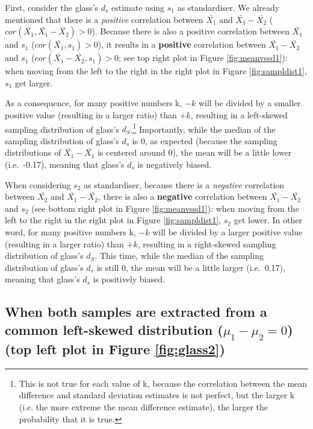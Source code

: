 \documentclass[
  man,floatsintext]{apa6}
\begin{document}
First, consider the glass's \(d_s\) estimate using \(s_1\) as standardiser. We already mentioned that there is a \emph{positive} correlation between \(\bar{X_1}\) and \(\bar{X_1}-\bar{X_2}\) (\(cor(\bar{X_1},\bar{X_1}-\bar{X_2})>0\)). Because there is also a positive correlation between \(\bar{X_1}\) and \(s_1\) (\(cor(\bar{X_1},s_1)>0\)), it results in a \textbf{positive} correlation between \(\bar{X_1}-\bar{X_2}\) and \(s_1\) (\(cor(\bar{X_1}-\bar{X_2},s_1)>0\); see top right plot in Figure \ref{fig:meanvssd1}): when moving from the left to the right in the right plot in Figure \ref{fig:sampldist1}, \(s_1\) get larger.

As a consequence, for many positive numbers k, \(-k\) will be divided by a smaller positive value (resulting in a larger ratio) than \(+k\), resulting in a left-skewed sampling distribution of glass's \(d_S\).\footnote{This is not true for each value of k, because the correlation between the mean difference and standard deviation estimates is not perfect, but the larger k (i.e. the more extreme the mean difference estimate), the larger the probability that it is true.} Importantly, while the median of the sampling distribution of glass's \(d_s\) is 0, as expected (because the sampling distributions of \(\bar{X_1}-\bar{X_1}\) is centered around 0), the mean will be a little lower (i.e.~-0.17), meaning that glass's \(d_s\) is negatively biased.

When considering \(s_2\) as standardiser, because there is a \emph{negative} correlation between \(\bar{X_2}\) and \(\bar{X_1}-\bar{X_2}\), there is also a \textbf{negative} correlation between \(\bar{X_1}-\bar{X_2}\) and \(s_2\) (see bottom right plot in Figure \ref{fig:meanvssd1}): when moving from the left to the right in the right plot in Figure \ref{fig:sampldist1}, \(s_2\) get lower. In other word, for many positive numbers k, \(-k\) will be divided by a larger positive value (resulting in a larger ratio) than \(+ k\), resulting in a right-skewed sampling distribution of glass's \(d_S\). This time, while the median of the sampling distribution of glass's \(d_s\) is still 0, the mean will be a little larger (i.e.~0.17), meaning that glass's \(d_s\) is positively biased.

\hypertarget{when-both-samples-are-extracted-from-a-common-left-skewed-distribution-mu_1-mu_20-top-left-plot-in-figure}{%
\subsection{\texorpdfstring{When both samples are extracted from a common left-skewed distribution (\textbf{\(\mu_1-\mu_2=0\)}) (top left plot in Figure \ref{fig:glass2})}{When both samples are extracted from a common left-skewed distribution (\textbackslash mu\_1-\textbackslash mu\_2=0) (top left plot in Figure )}}\label{when-both-samples-are-extracted-from-a-common-left-skewed-distribution-mu_1-mu_20-top-left-plot-in-figure}}
\end{document}
